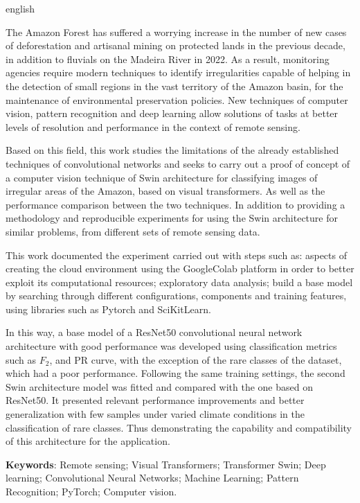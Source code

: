 
\begin{resumo}[Abstract]
 \begin{otherlanguage*}{english}

The Amazon Forest has suffered a worrying increase in the number of new cases of deforestation and artisanal mining on protected lands in the previous decade, in addition to fluvials on the Madeira River in 2022. As a result, monitoring agencies require modern techniques to identify irregularities capable of helping in the detection of small regions in the vast territory of the Amazon basin, for the maintenance of environmental preservation policies. New techniques of computer vision, pattern recognition and deep learning allow solutions of tasks at better levels of resolution and performance in the context of remote sensing.
  
Based on this field, this work studies the limitations of the already established techniques of convolutional networks and seeks to carry out a proof of concept of a computer vision technique of Swin architecture for classifying images of irregular areas of the Amazon, based on visual transformers. As well as the performance comparison between the two techniques. In addition to providing a methodology and reproducible experiments for using the Swin architecture for similar problems, from different sets of remote sensing data.

This work documented the experiment carried out with steps such as: aspects of creating the cloud environment using the GoogleColab platform in order to better exploit its computational resources; exploratory data analysis; build a base model by searching through different configurations, components and training features, using libraries such as Pytorch and SciKitLearn.

In this way, a base model of a ResNet50 convolutional neural network architecture with good performance was developed using classification metrics such as $F_2$, and PR curve, with the exception of the rare classes of the dataset, which had a poor performance. Following the same training settings, the second Swin architecture model was fitted and compared with the one based on ResNet50. It presented relevant performance improvements and better generalization with few samples under varied climate conditions in the classification of rare classes. Thus demonstrating the capability and compatibility of this architecture for the application.
  
\vspace{\onelineskip}

   \noindent 
   \textbf{Keywords}: Remote sensing; Visual Transformers; Transformer Swin; Deep learning; Convolutional Neural Networks; Machine Learning; Pattern Recognition; PyTorch; Computer vision.
 \end{otherlanguage*}
\end{resumo}
